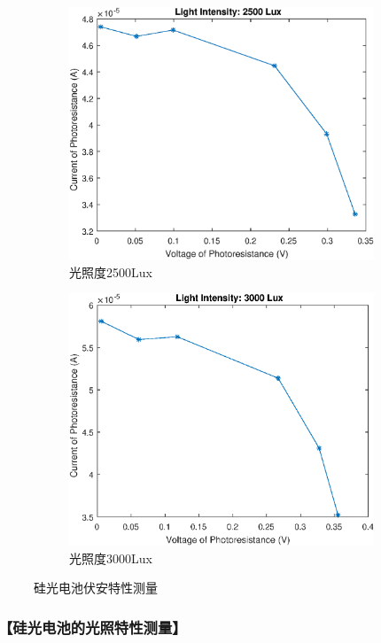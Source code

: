 \documentclass{ctexart}
\let\oldsubsubsection\subsubsection
\renewcommand{\subsubsection}[1]{\oldsubsubsection{\!\!\!\!\!\!【#1】}}
\begin{document}
\begin{figure}[H]
\begin{subfigure}{.45\textwidth}
    \includegraphics[width=\linewidth]{光电传感器综合实验图像/photocell_2500Lux}
    \caption{光照度2500Lux}
  \end{subfigure}
  \begin{subfigure}{.45\textwidth}
    \centering
    \includegraphics[width=\linewidth]{光电传感器综合实验图像/photocell_3000Lux}
    \caption{光照度3000Lux}
  \end{subfigure}
  \caption{硅光电池伏安特性测量}
\end{figure}

\subsubsection{硅光电池的光照特性测量}
\end{document}
